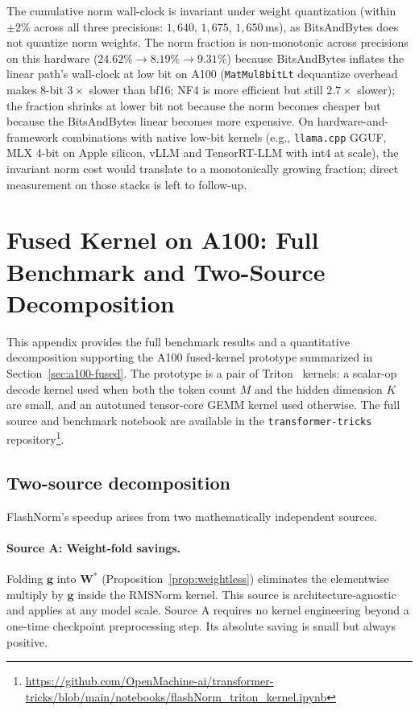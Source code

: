 \documentclass{article}
\begin{document}
The cumulative norm wall-clock is invariant under weight quantization (within $\pm 2\%$ across all three precisions: $1{,}640$, $1{,}675$, $1{,}650$\,ms), as BitsAndBytes does not quantize norm weights. The norm fraction is non-monotonic across precisions on this hardware ($24.62\% \to 8.19\% \to 9.31\%$) because BitsAndBytes inflates the linear path's wall-clock at low bit on A100 (\texttt{MatMul8bitLt} dequantize overhead makes 8-bit $3\times$ slower than bf16; NF4 is more efficient but still $2.7\times$ slower); the fraction shrinks at lower bit not because the norm becomes cheaper but because the BitsAndBytes linear becomes more expensive. On hardware-and-framework combinations with native low-bit kernels (e.g., \texttt{llama.cpp} GGUF, MLX 4-bit on Apple silicon, vLLM and TensorRT-LLM with int4 at scale), the invariant norm cost would translate to a monotonically growing fraction; direct measurement on those stacks is left to follow-up.

\section{Fused Kernel on A100: Full Benchmark and Two-Source Decomposition}\label{app:a100}

This appendix provides the full benchmark results and a quantitative decomposition supporting the A100 fused-kernel prototype summarized in Section~\ref{sec:a100-fused}. The prototype is a pair of Triton~\citep{triton} kernels: a scalar-op decode kernel used when both the token count $M$ and the hidden dimension $K$ are small, and an autotuned tensor-core GEMM kernel used otherwise.
The full source and benchmark notebook are available in the \texttt{transformer-tricks} repository\footnote{\url{https://github.com/OpenMachine-ai/transformer-tricks/blob/main/notebooks/flashNorm\_triton\_kernel.ipynb}}.

\subsection{Two-source decomposition}

FlashNorm's speedup arises from two mathematically independent sources.

\paragraph{Source A: Weight-fold savings.} Folding $\mathbf{g}$ into $\mathbf{W}^\ast$ (Proposition~\ref{prop:weightless}) eliminates the elementwise multiply by $\mathbf{g}$ inside the RMSNorm kernel. This source is architecture-agnostic and applies at any model scale. Source A requires no kernel engineering beyond a one-time checkpoint preprocessing step. Its absolute saving is small but always positive.
\end{document}
